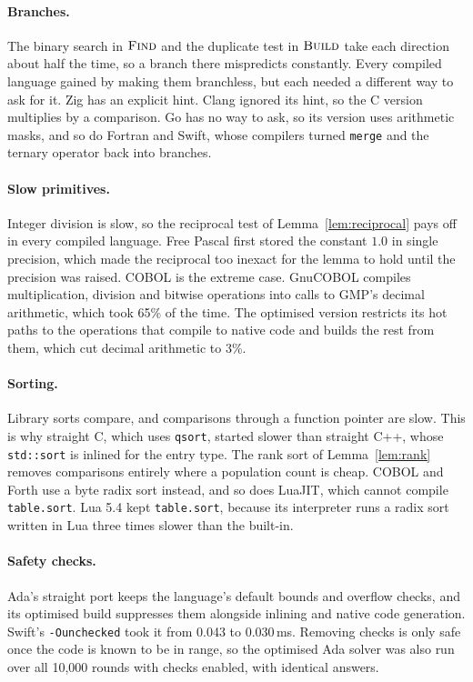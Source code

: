 \documentclass[11pt,a4paper]{article}
\theoremstyle{definition}
\theoremstyle{remark}
\newcommand{\proc}[1]{\textnormal{\textsc{#1}}}
\begin{document}
\paragraph{Branches.}
The binary search in $\proc{Find}$ and the duplicate test in $\proc{Build}$ take each direction about
half the time, so a branch there mispredicts constantly. Every compiled language gained by making them
branchless, but each needed a different way to ask for it. Zig has an explicit hint. Clang ignored its
hint, so the C version multiplies by a comparison. Go has no way to ask, so its version uses arithmetic
masks, and so do Fortran and Swift, whose compilers turned \texttt{merge} and the ternary operator back
into branches.

\paragraph{Slow primitives.}
Integer division is slow, so the reciprocal test of Lemma~\ref{lem:reciprocal} pays off in every
compiled language. Free Pascal first stored the constant $1.0$ in single precision, which made the
reciprocal too inexact for the lemma to hold until the precision was raised. COBOL is the extreme case.
GnuCOBOL compiles multiplication, division and bitwise operations into calls to GMP's decimal arithmetic,
which took 65\% of the time. The optimised version restricts its hot paths to the operations that compile to
native code and builds the rest from them, which cut decimal arithmetic to 3\%.

\paragraph{Sorting.}
Library sorts compare, and comparisons through a function pointer are slow. This is why straight C, which uses
\texttt{qsort}, started slower than straight C++, whose \texttt{std::sort} is inlined for the entry type. The
rank sort of Lemma~\ref{lem:rank} removes comparisons entirely where a population count is cheap. COBOL and Forth
use a byte radix sort instead, and so does LuaJIT, which cannot compile \texttt{table.sort}. Lua 5.4 kept \texttt{table.sort}, because its
interpreter runs a radix sort written in Lua three times slower than the built-in.

\paragraph{Safety checks.}
Ada's straight port keeps the language's default bounds and overflow checks, and its optimised build
suppresses them alongside inlining and native code generation. Swift's
\texttt{-Ounchecked} took it from 0.043 to 0.030\,ms. Removing checks is only safe once the code is known to be
in range, so the optimised Ada solver was also run over all 10{,}000 rounds with checks enabled, with
identical answers.
\end{document}
